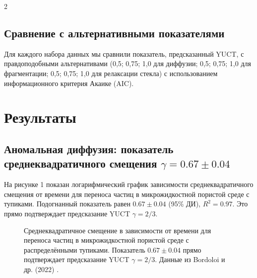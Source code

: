 \documentclass[11pt,a4paper]{article}
\begin{document}
\begin{multicols}{2}
		\subsection{Сравнение с альтернативными показателями}
		Для каждого набора данных мы сравнили показатель, предсказанный YUCT, с правдоподобными альтернативами (0,5; 0,75; 1,0 для диффузии; 0,5; 0,75; 1,0 для фрагментации; 0,5; 0,75; 1,0 для релаксации стекла) с использованием информационного критерия Акаике (AIC).
		
		\section{Результаты}
		
		\subsection{Аномальная диффузия: показатель среднеквадратичного смещения \(\gamma = 0.67 \pm 0.04\)}
		
		На рисунке 1 показан логарифмический график зависимости среднеквадратичного смещения от времени для переноса частиц в микрожидкостной пористой среде с тупиками. Подогнанный показатель равен \(0.67 \pm 0.04\) (95\% ДИ), \(R^2 = 0.97\). Это прямо подтверждает предсказание YUCT \(\gamma = 2/3\).
		
		\begin{figure}[htbp]
			\centering
			\caption{Среднеквадратичное смещение в зависимости от времени для переноса частиц в микрожидкостной пористой среде с распределёнными тупиками. Показатель \(0.67 \pm 0.04\) прямо подтверждает предсказание YUCT \(\gamma = 2/3\). Данные из Bordoloi и др. (2022) \cite{Bordoloi2022}.}
			\label{fig:diffusion}
		\end{figure}
		

\end{multicols}
\end{document}
